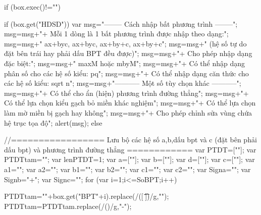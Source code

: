 if (box.exec()!=""){
	if (box.get("HDSD")) {
		var msg="-------- Cách nhập bất phương trình --------\n";
		msg=msg+"+ Mỗi 1 dòng là 1 bất phương trình được nhập theo dạng:\n";
		msg=msg+"           ax+by\<c,   ax+by\>c,   ax+by+c,   ax+by+c\n";
		msg=msg+"     (hệ số tự do đặt bên trái hay phải dấu BPT đều được)\n";
		msg=msg+"+ Cho phép nhập dạng đặc biệt:\n";
		msg=msg+"                 m\<ax\<M     hoặc    m\<by\<M\n";
		msg=msg+"+ Có thể nhập dạng phân số cho các hệ số kiểu: p\/q\n";
		msg=msg+"+ Có thể nhập dạng căn thức cho các hệ số kiểu: sqrt n\n\n";
		msg=msg+"----------- Một số tùy chọn khác -----------\n";
		msg=msg+"+ Có thể cho ẩn (hiện) phương trình đường thẳng\n";
		msg=msg+"+ Có thể lựa chọn kiểu gạch bỏ miền khác nghiệm\n";
		msg=msg+"+ Có thể lựa chọn làm mờ miền bị gạch hay không\n";
		msg=msg+"+ Cho phép chỉnh sửa vùng chứa hệ trục tọa độ";
		alert(msg);
	}
	else {
		//================= Lưu bộ các hệ số a,b,dấu bpt và c (đặt bên phải dấu bpt) và phương trình đường thẳng ============
		var PTDT=[""]; var PTDTtam=""; var lenPTDT=1;
		var a=[""];	var b=[""]; var d=[""];	var c=[""];
		var a1="";  var a2="";  var b1="";  var b2=""; var c1=""; var c2="";
		var Signa=""; var Signb="+"; var Signc="";
		for (var i=1;i<=SoBPT;i++) {
			PTDTtam="\+"+box.get("BPT"+i).replace(/([ \=\t\*])/g,"");
			PTDTtam=PTDTtam.replace(/(\+\-)/g,"-");
			
}}}
